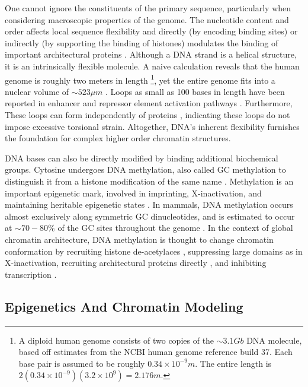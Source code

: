 One cannot ignore the constituents of the primary sequence, particularly when considering macroscopic properties of the genome.  The nucleotide content and
order affects local sequence flexibility and directly (by encoding binding sites) or indirectly (by supporting the binding of histones)
modulates the binding of important architectural proteins \citep{travers2004}.  Although a \gls{DNA} strand is a helical structure, it is an intrinsically
flexible molecule.  A naive calculation reveals that the human genome is roughly two meters in length%
\footnote{%
  A diploid human genome consists of two copies of the $\sim3.1Gb$ DNA molecule, based off estimates from the \gls{NCBI} human genome reference build 37.
  Each base pair is assumed to be roughly $0.34\times10^{-9}m$.  The entire length is $2(0.34 \times 10^{-9})(3.2 \times 10^9) = 2.176m$.
},
yet the entire genome fits into a nuclear volume of $\sim523\mu{}m$ \citep{marks2011}.  Loops as small as 100 bases in length have been
reported in enhancer and repressor element activation pathways \citep{wong2008}.  Furthermore, These loops can form independently of proteins
\citep{vafabakhsh2012}, indicating these loops do not impose excessive torsional strain.  Altogether, \gls{DNA}'s inherent flexibility furnishes the
foundation for complex higher order chromatin structures.

\gls{DNA} bases can also be directly modified by binding additional biochemical groups.  Cytosine undergoes \gls{DNA} methylation, also called GC methylation
to distinguish it from a histone modification of the same name \citep{bird2002}.  Methylation is an important epigenetic mark, involved in imprinting,
\gls{X-inactivation}, and maintaining heritable epigenetic states \citep{law2010}.  In mammals, \gls{DNA} methylation occurs almost exclusively along
symmetric \gls{GC} dinucleotides, and is estimated to occur at $\sim70-80\%$ of the \gls{GC} sites throughout the genome \citep{ehrlich1982,law2010}.
In the context of global chromatin architecture, \gls{DNA} methylation is thought to change chromatin conformation by recruiting histone
de-acetylaces \citep{schubeler2000}, suppressing large domains as in X-inactivation, recruiting architectural proteins directly \citep{yu2000},
and inhibiting transcription \citep{kass1997}.

\subsection*{Epigenetics And Chromatin Modeling}

